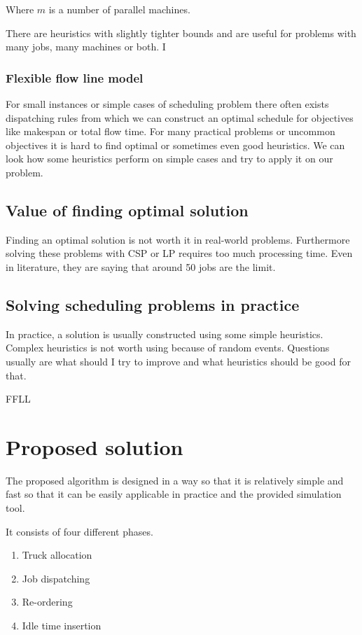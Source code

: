 \documentclass{ctuthesis}
\begin{document}
Where $m$ is a number of parallel machines.

There are heuristics with slightly tighter bounds and are useful for problems with many jobs, many machines or both. I 

\subsection{Flexible flow line model}

For small instances or simple cases of scheduling problem there often exists dispatching rules from which we can construct an optimal schedule for objectives like makespan or total flow time. For many practical problems or uncommon objectives it is hard to find optimal or sometimes even good heuristics. We can look how some heuristics perform on simple cases and try to apply it on our problem. 

\section{Value of finding optimal solution}
Finding an optimal solution is not worth it in real-world problems. Furthermore solving these problems with CSP or LP requires too much processing time. Even in literature, they are saying that around 50 jobs are the limit. 
\section{Solving scheduling problems in practice}
In practice, a solution is usually constructed using some simple heuristics. Complex heuristics is not worth using because of random events. Questions usually are what should I try to improve and what heuristics should be good for that. 

FFLL 


\chapter{Proposed solution}
\label{ch:Proposed solution}

The proposed algorithm is designed in a way so that it is relatively simple and fast so that it can be easily applicable in practice and the provided simulation tool.

It consists of four different phases.

\begin{enumerate}
    \item Truck allocation
    \item Job dispatching
    \item Re-ordering
    \item Idle time insertion
\end{enumerate}
\end{document}
